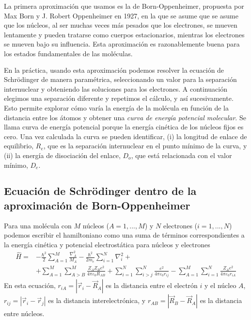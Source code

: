 \documentclass{tufte-handout}
\begin{document}
La primera aproximación que usamos es la de Born-Oppenheimer,
propuesta por Max Born y J. Robert Oppenheimer en 1927, en
la que se asume que se asume que los núcleos, al ser muchas
veces más pesados que los electrones, se mueven lentamente
y pueden tratarse como cuerpos estacionarios, mientras los 
electrones se mueven bajo su influencia. Esta aproximación es 
razonablemente buena para los estados fundamentales de las 
moléculas. 

En la práctica, usando esta aproximación podemos 
resolver la ecuación de Schrödinger de manera 
paramétrica, seleccionando
un valor para la separación internuclear y obteniendo
las soluciones para los electrones. A continuación elegimos 
una separación diferente y repetimos el cálculo, y así
sucesivamente. Esto permite explorar cómo varía la energía 
de la molécula en función de la distancia entre los átomos
y obtener una \textit{curva de energía potencial molecular}.
Se llama curva de energía potencial porque la energía cinética
de los núcleos fijos es cero. Una vez calculada la curva se
pueden identificar, (i) la longitud de enlace de equilibrio,
$R_e$, que es la separación internuclear en el punto mínimo de
la curva, y (ii) la energía de disociación del enlace, $D_o$,
que está relacionada con el valor mínimo, $D_e$.

\subsection{Ecuación de Schrödinger dentro de la 
aproximación de Born-Oppenheimer}
Para una molécula con $M$ núcleos ($A=1,...,M$) y 
$N$ electrones ($i=1,...,N$) podemos escribir el hamiltoniano
como una suma de términos correspondientes a la energía cinética
y potencial electrostática para núcleos y electrones
\begin{equation}
 \begin{split}  
\hat{H}=& -\frac{\hbar^2}{2}\sum_{A=1}^M\frac{\nabla^2_A}{M_A}
    -\frac{\hbar^2}{2m_e}\sum_{i=1}^N\nabla^2_i
    +\\
&+\sum_{A=1}^M\sum_{A>B}^M\frac{Z_AZ_Be^2}{4\pi\varepsilon_0R_{AB}}
+\sum_{i=1}^N\sum_{i>j}^N \frac{e^2}{4\pi\varepsilon_0r_{ij}}
-\sum_{A=1}^M\sum_{i=1}^{N}\frac{Z_Ae^2}{4\pi\varepsilon_0r_{iA}}
\end{split}
\end{equation}
En esta ecuación, $r_{iA}=|\vec{r}_i-\vec{R}_A|$ es la distancia
entre el electrón $i$ y el núcleo $A$, $r_{ij}=|\vec{r}_i-\vec{r}_j|$ 
es la distancia interelectrónica, y $r_{AB}=|\vec{R}_B-\vec{R}_A|$
es la distancia entre núcleos.
\end{document}

